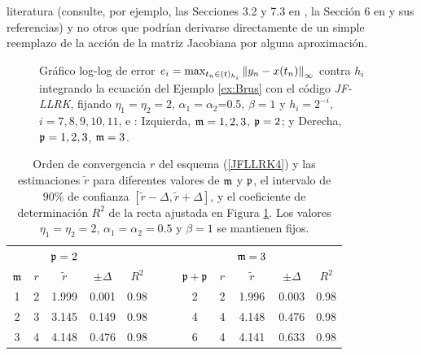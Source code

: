 literatura (consulte, por ejemplo, las Secciones 3.2 y 7.3 en \cite{hochbruck1998exponential}, la Sección 6 en \cite{einkemmer2017performance} y sus referencias) y no otros que podrían derivarse directamente de un simple reemplazo de la acción de la matriz Jacobiana por alguna aproximación.

\vspace{0.5cm}

\begin{figure}[htb]
	\centering
	\caption{Gráfico log-log de error ${e_i=\max_{t_n\in(t)_{h_i}}\left\lVert y_n-x(t_n) \right\rVert_\infty}$ contra $h_i$ integrando la ecuación del Ejemplo \ref{ex:Brus} con el código \textit{JF-LLRK}, fijando $\eta_1=\eta_2=2$, $\alpha_1=\alpha_2$=0.5, $\beta=1$ y $h_i=2^{-i}$, $i=7,8,9,10,11$, e : Izquierda, $\mathfrak{m}=1,2,3$, $\mathfrak{p}=2$; y Derecha, $\mathfrak{p}=1,2,3$, $\mathfrak{m}=3$.} \label{Fig1}
\end{figure}

\vspace{0.5cm}

\begin{table}[htb]
	\centering
	\caption{
		Orden de convergencia $r$ del esquema (\ref{JFLLRK4}) y las estimaciones $\widetilde{r}$ para diferentes valores de $\mathfrak{m}$ y $\mathfrak{p}$, el intervalo de $90\%$ de confianza $[\widetilde{r}-\varDelta,\widetilde{r}+\varDelta]$, y el coeficiente de determinación $R^2$ de la recta ajustada en Figura \ref{Fig1}. Los valores $\eta_1=\eta_2=2$, $\alpha_1=\alpha_2=0.5$ y $\beta=1$ se mantienen fijos.}
	\begin{adjustbox}{width=0.8\columnwidth,center}
		\begin{tabular}{cccccllccccc}
			\cline{1-12}
			&  & $\mathfrak{p}=2$ &  &  &  &  &  &  & $\mathfrak{m}=3$ &  &  \\ \cline{2-5}\cline{9-12}
			$\mathfrak{m}$ & $r$ & $\widetilde{r}$ & $\pm \varDelta$ & $R^{2}$ &  &  & $\mathfrak{p}+\mathfrak{p}$
			& $r$ & $\widetilde{r}$ & $\pm \varDelta$ & $R^{2}$ \\ 
			\cline{1-5}\cline{8-12}
			1 & 2 & 1.999 & 0.001 & 0.98 &  &  & 2 & 2 & 1.996 & 0.003 & 0.98 \\ 
			2 & 3 & 3.145 & 0.149 & 0.98 &  &  & 4 & 4 & 4.148 & 0.476 & 0.98 \\ 
			3 & 4 & 4.148 & 0.476 & 0.98 &  &  & 6 & 4 & 4.141 & 0.633 & 0.98 \\ 
			\cline{1-12}
		\end{tabular}
	\end{adjustbox}
	\label{tab:mporders}
\end{table}


